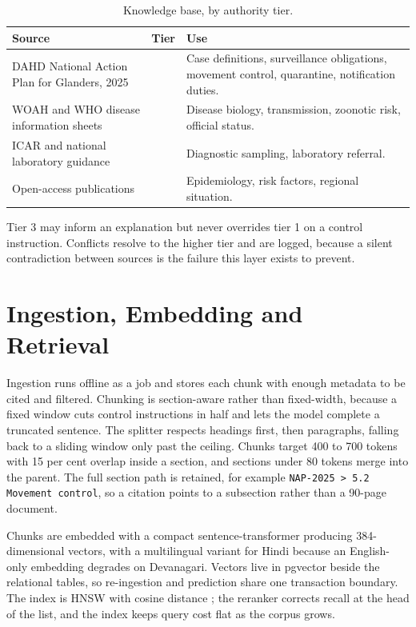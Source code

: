 \documentclass[10pt,openany]{report}
\begin{document}
\begin{table}[htbp]
\centering
\caption{Knowledge base, by authority tier.}
\label{tab:corpus}
\small
\begin{tabular}{@{}>{\raggedright\arraybackslash}p{5.0cm}>{\raggedright\arraybackslash}p{1.6cm}>{\raggedright\arraybackslash}p{7.0cm}@{}}
\toprule
\textbf{Source} & \textbf{Tier} & \textbf{Use} \\
\midrule
DAHD National Action Plan for Glanders, 2025 \cite{dahd2025} & 1 & Case definitions, surveillance obligations, movement control, quarantine, notification duties. \\
WOAH and WHO disease information sheets & 1 & Disease biology, transmission, zoonotic risk, official status. \\
ICAR and national laboratory guidance & 2 & Diagnostic sampling, laboratory referral. \\
Open-access publications & 3 & Epidemiology, risk factors, regional situation. \\
\bottomrule
\end{tabular}
\end{table}

Tier 3 may inform an explanation but never overrides tier 1 on a control instruction. Conflicts
resolve to the higher tier and are logged, because a silent contradiction between sources is the
failure this layer exists to prevent.

\section{Ingestion, Embedding and Retrieval}

Ingestion runs offline as a job and stores each chunk with enough metadata to be cited and filtered.
Chunking is section-aware rather than fixed-width, because a fixed window cuts control instructions in
half and lets the model complete a truncated sentence. The splitter respects headings first, then
paragraphs, falling back to a sliding window only past the ceiling. Chunks target 400 to 700 tokens
with 15 per cent overlap inside a section, and sections under 80 tokens merge into the parent. The
full section path is retained, for example \texttt{NAP-2025 > 5.2 Movement control}, so a citation
points to a subsection rather than a 90-page document.

Chunks are embedded with a compact sentence-transformer \cite{reimers2019} producing 384-dimensional
vectors, with a multilingual variant for Hindi because an English-only embedding degrades on
Devanagari. Vectors live in pgvector beside the relational tables, so re-ingestion and prediction share
one transaction boundary. The index is HNSW with cosine distance \cite{malkov2020}; the reranker
corrects recall at the head of the list, and the index keeps query cost flat as the corpus grows.
\end{document}
